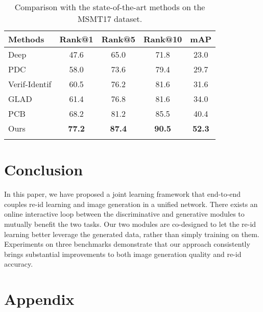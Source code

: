 \documentclass[10pt,twocolumn,letterpaper]{article}
\begin{document}
\begin{table}[tbp]
\small
{
\setlength{\tabcolsep}{5pt}
\begin{tabular}{l|c|c|c|c}
\shline
Methods & Rank@1 & Rank@5 & Rank@10 & mAP \\
\hline
Deep \cite{szegedy2015going}  & 47.6 & 65.0 & 71.8 & 23.0 \\
PDC \cite{su2017pose} & 58.0 & 73.6 & 79.4 & 29.7 \\
Verif-Identif \cite{zheng2016discriminatively} & 60.5 & 76.2 & 81.6 & 31.6 \\ GLAD \cite{wei2017glad} & 61.4 & 76.8 & 81.6 & 34.0 \\
PCB \cite{sun2017beyond} & 68.2 & 81.2 & 85.5 & 40.4\\
\hline
Ours & \textbf{77.2} & \textbf{87.4} & \textbf{90.5} & \textbf{52.3} \\
\shline
\end{tabular}}
\caption{Comparison with the state-of-the-art methods on the MSMT17 dataset.}
\label{table:msmt}
\end{table}



\section{Conclusion}
In this paper, we have proposed a joint learning framework that end-to-end couples re-id learning and image generation in a unified network. There exists an online interactive loop between the discriminative and generative modules to mutually benefit the two tasks. Our two modules are co-designed to let the re-id learning better leverage the generated data, rather than simply training on them. Experiments on three benchmarks demonstrate that our approach consistently brings substantial improvements to both image generation quality and re-id accuracy.     




{\footnotesize


}

\clearpage

\appendix
\section*{Appendix}
\setcounter{section}{0}
\renewcommand\thesection{\Alph{section}}
\end{document}
